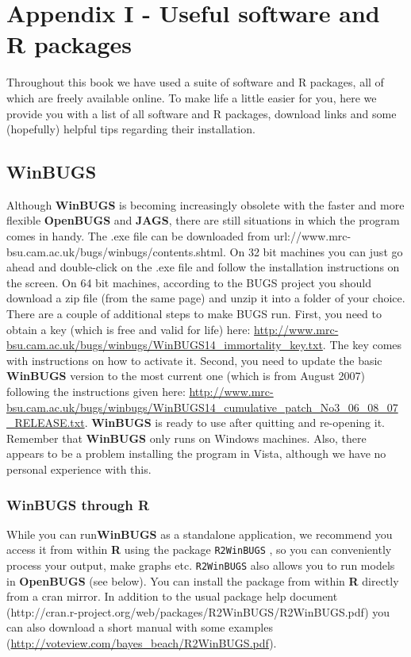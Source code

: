 
\chapter*{Appendix I - Useful software and R packages}
\label{chapt.app1}

\vspace{.3in}

Throughout this book we have used a suite of software and R packages, all of which are freely available online. To make life a little easier for you, here we provide you with a list of all software and R packages, download links and some (hopefully) helpful tips regarding their installation.  


\section{WinBUGS}
Although {\bf WinBUGS} \citep{gilks_etal:1994} is becoming increasingly obsolete with the faster and more flexible {\bf OpenBUGS} and {\bf JAGS}, there are still situations in which the program comes in handy.  
The .exe file can be downloaded from url{\http://www.mrc-bsu.cam.ac.uk/bugs/winbugs/contents.shtml}. On 32 bit machines you can just go ahead and double-click on the .exe file and follow the installation instructions on the screen.
On 64 bit machines, according to the BUGS project you should download a zip file (from the same page) and unzip it into a folder of your choice.
There are a couple of additional steps to make BUGS run. 
First, you need to obtain a key (which is free and valid for life) here: \url{http://www.mrc-bsu.cam.ac.uk/bugs/winbugs/WinBUGS14_immortality_key.txt}. The key comes with instructions on how to activate it.
Second, you need to update the basic {\bf WinBUGS} version to the most current one (which is from August 2007) following the instructions given here: \url{http://www.mrc-bsu.cam.ac.uk/bugs/winbugs/WinBUGS14_cumulative_patch_No3_06_08_07_RELEASE.txt}.
{\bf WinBUGS} is ready to use after quitting and re-opening it.
Remember that {\bf WinBUGS} only runs on Windows machines. Also, there appears to be a problem installing the program in Vista, although we have no personal experience with this.

\subsection{WinBUGS through R}
While you can run{\bf WinBUGS} as a standalone application, we recommend you access it from within {\bf R} using the package {\tt R2WinBUGS} \citep{sturtz_etal:2005}, so you can conveniently process your output, make graphs etc.   {\tt R2WinBUGS} also allows you to run models in {\bf OpenBUGS} (see below). You can install the package from within {\bf R} directly from a cran mirror. In addition to the usual package help document (http://cran.r-project.org/web/packages/R2WinBUGS/R2WinBUGS.pdf) you can also download a short manual with some examples (\url{http://voteview.com/bayes_beach/R2WinBUGS.pdf}). 



